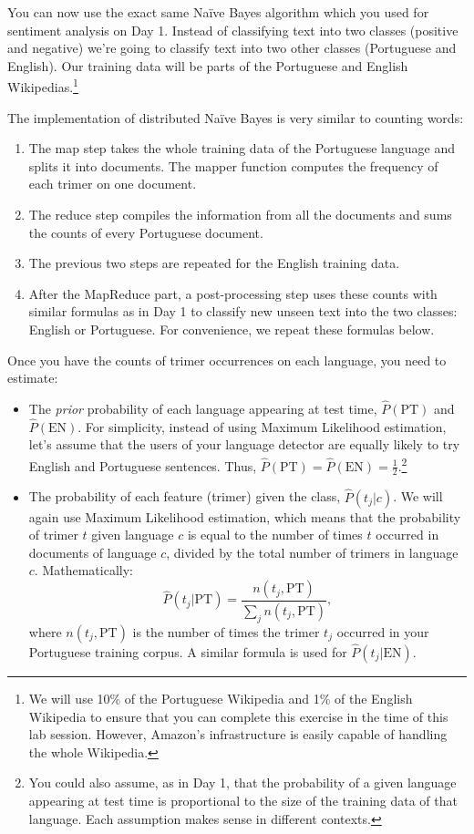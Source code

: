 You can now use the exact same Na\"{i}ve Bayes algorithm which you used for sentiment analysis on Day 1. Instead of classifying text into two classes (positive and negative) we're going to classify text into two other classes (Portuguese and English). Our training data will be parts of the Portuguese and English Wikipedias.\footnote{We will use 10\% of the Portuguese Wikipedia and 1\% of the English Wikipedia to ensure that you can complete this exercise in the time of this lab session. However, Amazon's infrastructure is easily capable of handling the whole Wikipedia.}

The implementation of distributed Na\"{i}ve Bayes is very similar to counting words:
\begin{enumerate}
	\item The map step takes the whole training data of the Portuguese language and splits it into documents. The mapper function computes the frequency of each trimer on one document.
	\item The reduce step compiles the information from all the documents and sums the counts of every Portuguese document.
	\item The previous two steps are repeated for the English training data.
	\item After the MapReduce part, a post-processing step uses these counts with similar formulas as in Day 1 to classify new unseen text into the two classes: English or Portuguese. For convenience, we repeat these formulas below.
\end{enumerate}

Once you have the counts of trimer occurrences on each language, you need to estimate:
\begin{itemize}
	\item The \emph{prior} probability of each language appearing at test time, ${\hat P}(\text{PT})$ and ${\hat P}(\text{EN})$. For simplicity, instead of using Maximum Likelihood estimation, let's assume that the users of your language detector are equally likely to try English and Portuguese sentences. Thus, ${\hat P}(\text{PT}) = {\hat P}(\text{EN}) = \frac{1}{2}$.\footnote{You could also assume, as in Day 1, that the probability of a given language appearing at test time is proportional to the size of the training data of that language. Each assumption makes sense in different contexts.}
	\item The probability of each feature (trimer) given the class, ${\hat P}(t_j | c)$. We will again use Maximum Likelihood estimation, which means that the probability of trimer $t$ given language $c$ is equal to the number of times $t$ occurred in documents of language $c$, divided by the total number of trimers in language $c$. Mathematically:
\begin{equation}
{\hat P}(t_j|\text{PT}) = \frac{n(t_j,\text{PT})}{\sum_j n(t_j,\text{PT})},
\end{equation}
where $n(t_j,\text{PT})$ is the number of times the trimer $t_j$ occurred in your Portuguese training corpus. A similar formula is used for ${\hat P}(t_j|\text{EN})$.
\end{itemize}

